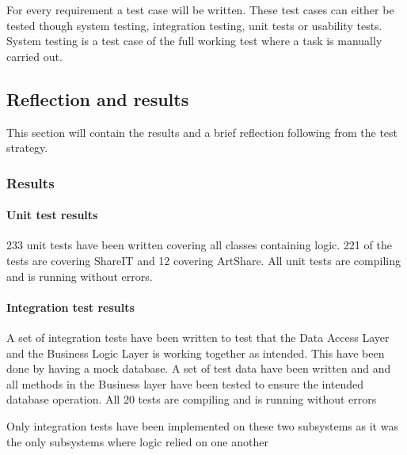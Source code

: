 \documentclass[../report.tex]{subfiles}
\begin{document}
For every requirement a test case will be written. These test cases can either be tested though system testing, integration testing, unit tests or usability tests. System testing is a test case of the full working test where a task is manually carried out. 

\subsection{Reflection and results}
This section will contain the results and a brief reflection following from the test strategy.

\subsubsection{Results}
\paragraph{Unit test results}

233 unit tests have been written covering all classes containing logic. 221 of the tests are covering ShareIT and 12 covering ArtShare. All unit tests are compiling and is running without errors.

\paragraph{Integration test results}

A set of integration tests have been written to test that the Data Access Layer and the Business Logic Layer is working together as intended. This have been done by having a mock database. A set of test data have been written and and all methods in the Business layer have been tested to ensure the intended database operation. All 20 tests are compiling and is running without errors

Only integration tests have been implemented on these two subsystems as it was the only subsystems where logic relied on one another
\end{document}
